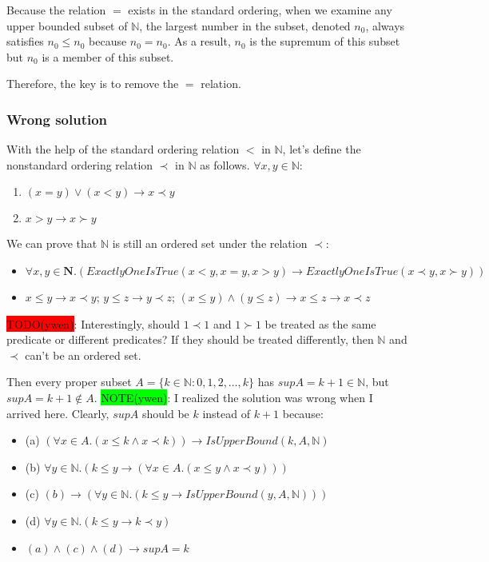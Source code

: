 \documentclass[12pt, letterpaper, oneside]{book}
\begin{document}
Because the relation $=$ exists in the standard ordering, when we examine any upper bounded subset of $\mathbb{N}$, the
largest number in the subset, denoted $n_0$, always satisfies $n_0 \le n_0$ because $n_0 = n_0$. As a result, $n_0$ is
the supremum of this subset but $n_0$ is a member of this subset.

Therefore, the key is to remove the $=$ relation.

\subsubsection{Wrong solution}

With the help of the standard ordering relation $<$ in $\mathbb{N}$, let's define the nonstandard ordering relation
$\prec$ in $\mathbb{N}$ as follows. $\forall x, y \in \mathbb{N}$:
\begin{enumerate}
  \item $(x = y) \lor (x < y) \rightarrow x \prec y$
  \item $x > y \rightarrow x \succ y$
\end{enumerate}

We can prove that $\mathbb{N}$ is still an ordered set under the relation $\prec$:
\begin{itemize}
  \item $\forall x, y \in \mathbf{N}. (ExactlyOneIsTrue(x < y, x = y, x > y) \rightarrow ExactlyOneIsTrue(x \prec y, x \succ y))$
  \item $x \le y \rightarrow x \prec y$; $y \le z \rightarrow y \prec z$; $(x \le y) \land (y \le z) \rightarrow x \le z \rightarrow x \prec z$
\end{itemize}

\colorbox{red}{TODO(ywen)}: Interestingly, should $1 \prec 1$ and $1 \succ 1$ be treated as the same predicate or
different predicates? If they should be treated differently, then $\mathbb{N}$ and $\prec$ can't be an ordered set.

Then every proper subset $A = \{ k \in \mathbb{N}: 0, 1, 2, \ldots, k \}$ has $sup A = k + 1 \in \mathbb{N}$, but
$sup A = k+1 \notin A$. \colorbox{lime}{NOTE(ywen)}: I realized the solution was wrong when I arrived here. Clearly,
$sup A$ should be $k$ instead of $k+1$ because:
\begin{itemize}
  \item (a) $(\forall x \in A. (x \le k \land x \prec k)) \rightarrow IsUpperBound(k, A, \mathbb{N})$
  \item (b) $\forall y \in \mathbb{N}. (k \le y \rightarrow (\forall x \in A. (x \le y \land x \prec y)))$
  \item (c) $(b) \rightarrow (\forall y \in \mathbb{N}. (k \le y \rightarrow IsUpperBound(y, A, \mathbb{N})))$
  \item (d) $\forall y \in \mathbb{N}. (k \le y \rightarrow k \prec y)$
  \item $(a) \land (c) \land (d) \rightarrow sup A = k$
\end{itemize}
\end{document}
